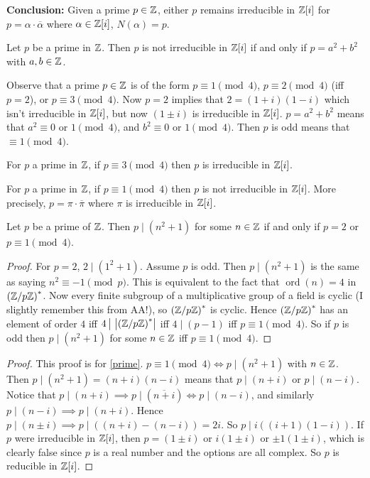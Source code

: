 \noindent \textbf{Conclusion:} Given a prime $p\in \mathbb{Z}$, either $p$ remains irreducible in $\mathbb{Z}[i]$ for $p=\alpha \cdot \overline{\alpha }$ where $\alpha \in \mathbb{Z}[i]$, $N(\alpha )=p$.
\begin{prop}
    Let $p$ be a prime in $\mathbb{Z}$. Then $p$ is not irreducible in $\mathbb{Z}[i]$ if and only if $p=a^2+b^2$ with $a,b\in \mathbb{Z}$.
\end{prop}
Observe that a prime $p \in \mathbb{Z}$ is of the form $p\equiv 1\pmod 4$, $p\equiv 2 \pmod 4$ (iff $p=2$), or $p\equiv 3\pmod 4$. Now $p=2$ implies that $2=(1+i)(1-i)$ which isn't irreducible in $\mathbb{Z}[i]$, but now $(1\pm i)$ is irreducible in $\mathbb{Z}[i]$. $p=a^2+b^2$ means that $a^2\equiv 0$ or $1\pmod 4$, and $b^2\equiv 0$ or $1\pmod 4$. Then $p$ is odd means that $\equiv 1\pmod 4$.
\begin{prop}
    For $p$ a prime in $\mathbb{Z}$, if $p\equiv 3\pmod 4$ then $p$ is irreducible in $\mathbb{Z}[i]$.
\end{prop}
\begin{prop}\label{prime}
    For $p$ a prime in $\mathbb{Z}$, if $p\equiv 1\pmod 4$ then $p$ is not irreducible in $\mathbb{Z}[i]$. More precisely, $p=\pi\cdot \overline{\pi}$ where $\pi$ is irreducible in $\mathbb{Z}[i]$. 
\end{prop}
\begin{lemma}
    Let $p$ be a prime of $\mathbb{Z}$. Then $p \mid (n^2+1)$ for some $n\in \mathbb{Z}$ if and only if $p=2$ or $p\equiv 1\pmod 4$.
\end{lemma}
\begin{proof}
    For $p=2$, $2 \mid (1^2+1)$. Assume $p$ is odd. Then $p \mid (n^2+1)$ is the same as saying $n^2\equiv -1 \pmod p$. This is equivalent to the fact that $\operatorname{ord}(n)=4$ in $\left( \mathbb{Z} /p\mathbb{Z} \right)^{*} $. Now every finite subgroup of a multiplicative group of a field is cyclic (I slightly remember this from AA!), so $\left( \mathbb{Z} /p\mathbb{Z} \right)^* $ is cyclic. Hence $\left( \mathbb{Z} /p\mathbb{Z} \right)^* $ has an element of order $4$ iff $4 \, \big |\, \left| \left( \mathbb{Z} /p\mathbb{Z} \right)^*  \right| $ iff $4 \mid (p-1)$ iff $p\equiv 1\pmod 4.$ So if $p$ is odd then $p \mid (n^2+1)$ for some $n\in \mathbb{Z}$ iff $p\equiv 1\pmod 4$.
\end{proof}
\begin{proof}
    This proof is for \cref{prime}. $p\equiv 1\pmod 4 \iff p \mid (n^2+1)$ with $n\in \mathbb{Z}$. Then $p \mid (n^2+1)=(n+i)(n-i)$ means that $p \mid (n+i)$ or $ p\mid (n-i)$. Notice that $p \mid (n+i)\implies p \mid \left( \overline{n+i} \right) \iff p \mid (n-i)$, and similarly $p \mid (n-i)\implies p \mid (n+i)$. Hence $p \mid (n\pm i) \implies  p \mid \left( (n+i)-(n-i) \right) =2i$. So $p \mid i\left( (i+1)(1-i) \right) $. If $p$ were irreducible in $\mathbb{Z}[i]$, then $p=(1\pm i)$ or $i\left( 1\pm i \right) $ or $\pm 1(1\pm i)$, which is clearly false since $p$ is a real number and the options are all complex. So $p$ is reducible in $\mathbb{Z}[i]$.
\end{proof}
